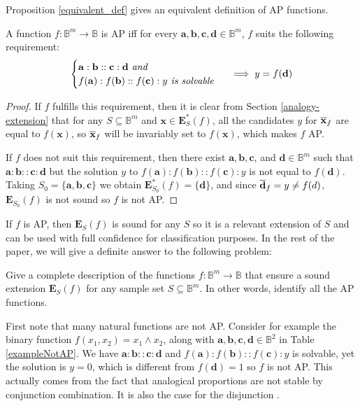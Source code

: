 \noindent
Proposition \ref{equivalent_def} gives an equivalent definition of AP
functions.

\begin{proposition}\label{equivalent_def}
  A function $f \colon \mathbb{B}^m \to \mathbb{B}$ is AP iff for every
  $\mathbf{a}, \mathbf{b}, \mathbf{c}, \mathbf{d} \in \mathbb{B}^m$, $f$ suits
  the following requirement:
  $$
  \begin{cases}
    \mathbf{a} :  \mathbf{b} ::  \mathbf{c} :  \mathbf{d} \emph{ and }\\
  f(\mathbf{a}) :  f(\mathbf{b}) ::  f(\mathbf{c}) :  y \emph{ is solvable  }
  \end{cases}
  \implies y = f(\mathbf{d})
  $$
\end{proposition}
\begin{proof}
  If $f$ fulfills  this requirement, then it is clear from Section
  \ref{analogy-extension} that for any $S \subseteq
  \mathbb{B}^m$ and $\mathbf{x} \in \mathbf{E}^*_S(f)$, all the candidates $y$
  for $\overline{\mathbf{x}}_f$ are equal to $f(\mathbf{x})$, so
  $\overline{\mathbf{x}}_f$ will be invariably set to $f(\mathbf{x})$, which makes
  $f$ AP.

If $f$ does not suit this requirement, then there exist $\mathbf{a},
  \mathbf{b}, \mathbf{c}$, and $\mathbf{d} \in \mathbb{B}^m$ such that
  $\mathbf{a} : \mathbf{b} :: \mathbf{c} : \mathbf{d}$ but the solution $y$ to
  $f(\mathbf{a}) : f(\mathbf{b}) :: f(\mathbf{c}) : y$ is not equal to
  $f(\mathbf{d})$. Taking $S_0 = \{\mathbf{a}, \mathbf{b}, \mathbf{c}\}$ we
  obtain $\mathbf{E}^*_{S_0}(f) = \{\mathbf{d}\}$, and since $\overline{\mathbf{d}}_f = y
  \neq f(d)$, $\mathbf{E}_{S_0}(f)$ is not sound so $f$ is not AP.
\end{proof}

If $f$ is AP, then $\mathbf{E}_S(f)$ is sound for any $S$ so it is a relevant
extension of $S$ and can be used with full confidence for classification
purposes. In the rest of the paper, we will give a definite answer to the
following problem:

\begin{problem}\label{prob}
  Give a complete description of the functions $f\colon \mathbb{B}^m\to
  \mathbb{B}$ that ensure a sound extension $\mathbf{E}_S(f)$ for any sample
  set $S\subseteq \mathbb{B}^m$. In other words, identify all the AP
  functions.
\end{problem}

First note that many natural functions are not AP. Consider for example the
binary function $f(x_1,x_2)= x_1 \wedge x_2$, along with $\mathbf{a},
\mathbf{b}, \mathbf{c}, \mathbf{d} \in \mathbb{B}^2$ in Table
\ref{exampleNotAP}.  We have $\mathbf{a} : \mathbf{b} :: \mathbf{c} :
\mathbf{d}$ and $f(\mathbf{a}) : f(\mathbf{b}) :: f(\mathbf{c}) : y$ is
solvable, yet the solution is $y=0$, which  is different from $f(\mathbf{d})=1$
so $f$ is not AP. This actually comes from the fact that analogical proportions
are not stable by conjunction combination. It is also the case for the
disjunction \cite{PraRic14}.

